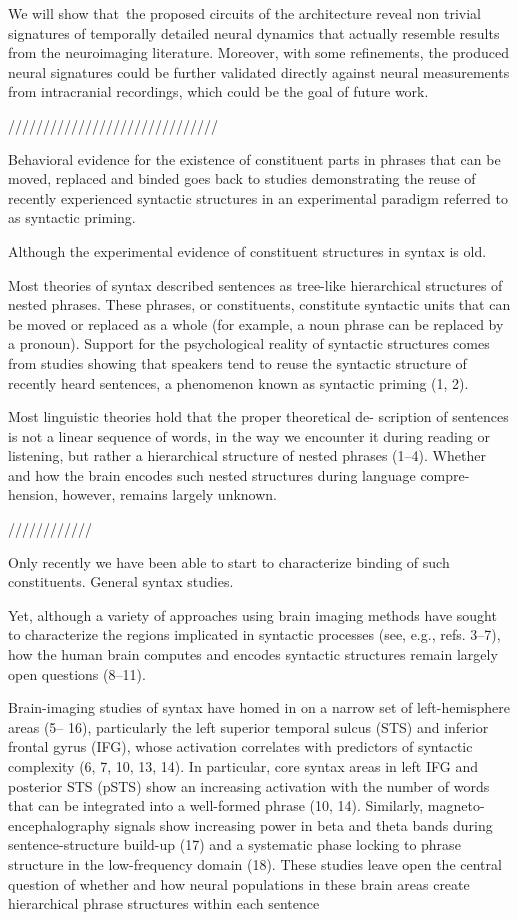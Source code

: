 \documentclass[10pt]{article}
\begin{document}
We will show that~the proposed circuits of
the architecture reveal non trivial signatures of temporally detailed
neural dynamics that actually resemble results from the neuroimaging
literature. Moreover, with some refinements, the produced neural
signatures could be further validated directly against neural
measurements from intracranial recordings, which could be the goal of
future work.

//////////////////////////////


Behavioral evidence for the existence of constituent parts in phrases that can be moved, replaced and binded goes back to studies demonstrating the reuse of recently experienced syntactic structures in an experimental paradigm referred to as syntactic priming\cite{branigan2000syntactic, bock2007persistent}.

Although the experimental evidence of constituent structures in syntax is old.

Most theories of syntax described sentences as tree-like hierarchical structures of nested phrases. These phrases, or constituents, constitute syntactic units that can be moved or replaced as a whole (for example, a noun phrase can be replaced by a pronoun). Support for the psychological reality of syntactic structures comes from studies showing that speakers tend to reuse the syntactic structure of recently heard sentences, a phenomenon known as syntactic priming (1, 2). 

Most linguistic theories hold that the proper theoretical de-
scription of sentences is not a linear sequence of words, in
the way we encounter it during reading or listening, but rather a
hierarchical structure of nested phrases (1–4). Whether and how
the brain encodes such nested structures during language compre-
hension, however, remains largely unknown.

////////////

Only recently we have been able to start to characterize binding of such constituents. General syntax studies.

Yet, although a variety of approaches using brain imaging methods have sought to characterize the regions implicated in syntactic processes (see, e.g., refs. 3–7), how the human brain computes and encodes syntactic structures remain largely open questions (8–11).

 Brain-imaging studies
of syntax have homed in on a narrow set of left-hemisphere areas (5–
16), particularly the left superior temporal sulcus (STS) and inferior
frontal gyrus (IFG), whose activation correlates with predictors of
syntactic complexity (6, 7, 10, 13, 14). In particular, core syntax areas
in left IFG and posterior STS (pSTS) show an increasing activation
with the number of words that can be integrated into a well-formed
phrase (10, 14). Similarly, magneto-encephalography signals show
increasing power in beta and theta bands during sentence-structure
build-up (17) and a systematic phase locking to phrase structure in
the low-frequency domain (18).
These studies leave open the central question of whether and
how neural populations in these brain areas create hierarchical
phrase structures within each sentence
\end{document}
